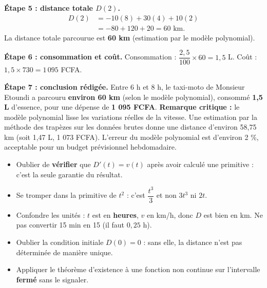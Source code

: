 \documentclass[11pt]{article}
\newcounter{popsec}
\newcounter{popsub}
\newcommand{\courssub}[1]{%
  \stepcounter{popsub}%
  \par\vspace{9pt}\noindent{\popxbold\fontsize{11.5}{13}\selectfont\color{popink}{\color{poporange}\thepopsec.\thepopsub}\hspace{6pt}#1}\par\nopagebreak\vspace{4pt}
}
\begin{document}
\begin{exoresolu}
\textbf{Étape 5 : distance totale $D(2)$.}
\begin{align*}
D(2) &= -10(8) + 30(4) + 10(2) \\
&= -80 + 120 + 20 = 60 \text{ km}.
\end{align*}
La distance totale parcourue est \textbf{60 km} (estimation par le modèle polynomial).

\textbf{Étape 6 : consommation et coût.}
Consommation : $\dfrac{2,5}{100} \times 60 = 1,5$ L.
Coût : $1,5 \times 730 = 1\,095$ FCFA.

\textbf{Étape 7 : conclusion rédigée.}
Entre 6 h et 8 h, le taxi-moto de Monsieur Etoundi a parcouru \textbf{environ 60 km} (selon le modèle polynomial), consommé \textbf{1,5 L} d'essence, pour une dépense de \textbf{1 095 FCFA}.
\textbf{Remarque critique :} le modèle polynomial lisse les variations réelles de la vitesse. Une estimation par la méthode des trapèzes sur les données brutes donne une distance d'environ 58,75 km (soit 1,47 L, 1 073 FCFA). L'erreur du modèle polynomial est d'environ 2 \%, acceptable pour un budget prévisionnel hebdomadaire.
\end{exoresolu}

\begin{attention}
\begin{itemize}
\item Oublier de \textbf{vérifier} que $D'(t)=v(t)$ après avoir calculé une primitive : c'est la seule garantie du résultat.
\item Se tromper dans la primitive de $t^2$ : c'est $\dfrac{t^3}{3}$ et non $3t^3$ ni $2t$.
\item Confondre les unités : $t$ est en \textbf{heures}, $v$ en km/h, donc $D$ est bien en km. Ne pas convertir 15 min en 15 (il faut $0,25$ h).
\item Oublier la condition initiale $D(0)=0$ : sans elle, la distance n'est pas déterminée de manière unique.
\item Appliquer le théorème d'existence à une fonction non continue sur l'intervalle \textbf{fermé} sans le signaler.
\end{itemize}
\end{attention}

\courssub{Bilan de la leçon}
\end{document}
